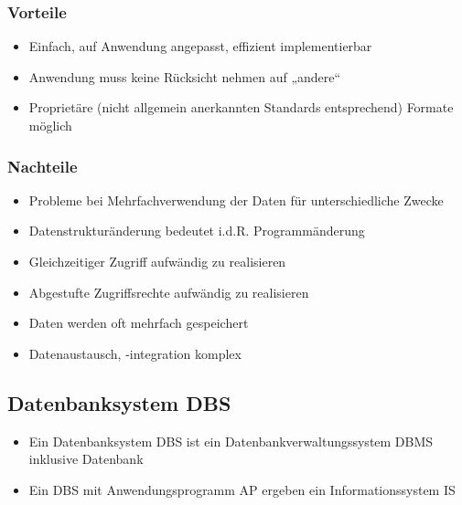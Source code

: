 \documentclass[8pt,a4paper]{scrartcl}
\begin{document}
\begin{multicols*}{3}
				\subsubsection{Vorteile}
					\begin{itemize}\itemsep0pt		
						\item Einfach, auf Anwendung angepasst, effizient implementierbar
						\item Anwendung muss keine Rücksicht nehmen auf „andere“
						\item Proprietäre (nicht allgemein anerkannten Standards entsprechend) Formate möglich
					\end{itemize}
					
				\subsubsection{Nachteile}
					\begin{itemize}\itemsep0pt		
						\item Probleme bei Mehrfachverwendung der Daten für unterschiedliche Zwecke
						\item Datenstrukturänderung bedeutet i.d.R. Programmänderung
						\item Gleichzeitiger Zugriff aufwändig zu realisieren
						\item Abgestufte Zugriffsrechte aufwändig zu realisieren
						\item Daten werden oft mehrfach gespeichert
						\item Datenaustausch, -integration komplex
					\end{itemize}
					
			\subsection{Datenbanksystem DBS}
				\begin{itemize}\itemsep0pt			
					\item Ein Datenbanksystem DBS ist ein Datenbankverwaltungssystem DBMS inklusive Datenbank
					\item Ein DBS mit Anwendungsprogramm AP ergeben ein Informationssystem IS
				\end{itemize}
				

\end{multicols*}
\end{document}
